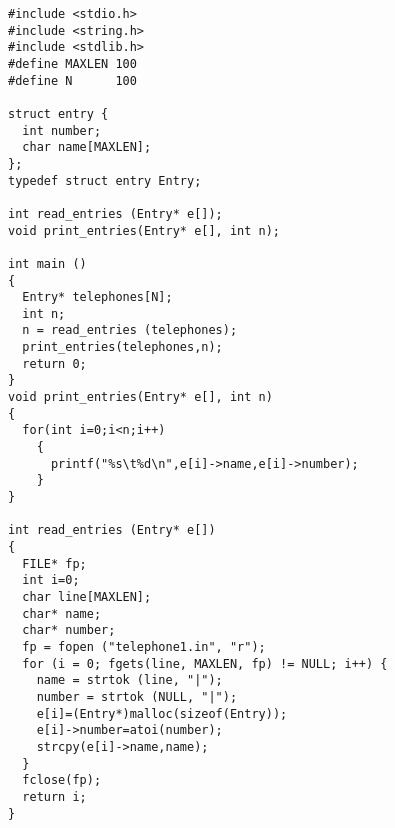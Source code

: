 \documentclass[11pt]{article}
\begin{document}
\begin{verbatim}
#include <stdio.h>
#include <string.h>
#include <stdlib.h>
#define MAXLEN 100
#define N      100

struct entry {
  int number;
  char name[MAXLEN];
};
typedef struct entry Entry;

int read_entries (Entry* e[]);
void print_entries(Entry* e[], int n);

int main ()
{
  Entry* telephones[N];
  int n; 
  n = read_entries (telephones);
  print_entries(telephones,n);
  return 0;
}
void print_entries(Entry* e[], int n)
{
  for(int i=0;i<n;i++)
    {
      printf("%s\t%d\n",e[i]->name,e[i]->number); 
    }
}

int read_entries (Entry* e[])
{
  FILE* fp;
  int i=0;
  char line[MAXLEN];
  char* name;
  char* number;
  fp = fopen ("telephone1.in", "r");
  for (i = 0; fgets(line, MAXLEN, fp) != NULL; i++) {
    name = strtok (line, "|");
    number = strtok (NULL, "|");
    e[i]=(Entry*)malloc(sizeof(Entry));
    e[i]->number=atoi(number);
    strcpy(e[i]->name,name);
  }
  fclose(fp);
  return i;
}
\end{verbatim}
\end{document}
